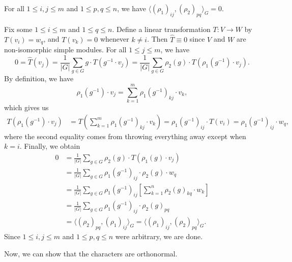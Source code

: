 \begin{theo}{}
    For all $1 \leq i, j \leq m$ and $1 \leq p, q \leq n$, we have 
    $\langle (\rho_1)_{ij}, (\rho_2)_{pq} \rangle_G = 0$. 
\end{theo}
\begin{pf}
    Fix some $1 \leq i \leq m$ and $1 \leq q \leq n$. Define a linear 
    transformation $T : V \to W$ by $T(v_i) = w_q$, and $T(v_k) = 0$
    whenever $k \neq i$. Then $\hat T \equiv 0$ since $V$ and $W$ 
    are non-isomorphic simple modules. For all $1 \leq j \leq m$, we have 
    \[ 0 = \hat T(v_j) = \frac1{|G|} \sum_{g \in G} g \cdot T(g^{-1} \cdot v_j) 
    = \frac1{|G|} \sum_{g\in G} \rho_2(g) \cdot T(\rho_1(g^{-1}) \cdot v_j). \]
    By definition, we have 
    \[ \rho_1(g^{-1}) \cdot v_j = \sum_{k=1}^m \rho_1(g^{-1})_{kj} \cdot v_k, \] 
    which gives us 
    \begin{align*}
        T(\rho_1(g^{-1}) \cdot v_j) 
        &= T \left( \sum_{k=1}^m \rho_1(g^{-1})_{kj} \cdot v_k \right) 
        = \rho_1(g^{-1})_{ij} \cdot T(v_i) 
        = \rho_1(g^{-1})_{ij} \cdot w_q, 
    \end{align*}
    where the second equality comes from throwing everything away except when 
    $k = i$. Finally, we obtain 
    \begin{align*}
        0 &= \frac1{|G|} \sum_{g\in G} \rho_2(g) \cdot T(\rho_1(g) \cdot v_j) \\ 
        &= \frac1{|G|} \sum_{g\in G} \rho_1(g^{-1})_{ij} \cdot \rho_2(g) \cdot w_q \\
        &= \frac1{|G|} \sum_{g\in G} \rho_1(g^{-1})_{ij} 
           \left[ \sum_{k=1}^n \rho_2(g)_{kq} \cdot w_k \right] \\
        &= \frac1{|G|} \sum_{g\in G} \rho_1(g^{-1})_{ij} \cdot \rho_2(g)_{pq} \\ 
        &= \langle (\rho_2)_{pq}, (\rho_1)_{ij} \rangle_G 
        = \langle (\rho_1)_{ij}, (\rho_2)_{pq} \rangle_G.
    \end{align*}
    Since $1 \leq i, j \leq m$ and $1 \leq p, q \leq n$ were arbitrary, we 
    are done. 
\end{pf}

Now, we can show that the characters are orthonormal. 

